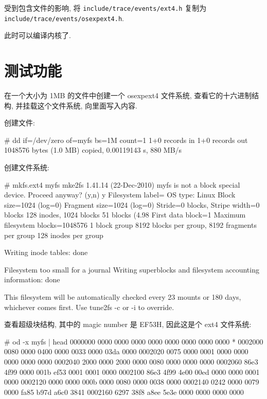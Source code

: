 \documentclass[11pt]{report}
\begin{document}
        受到包含文件的影响, 将 \verb|include/trace/events/ext4.h| 复制为 \\ \verb|include/trace/events/osexpext4.h|.

        此时可以编译内核了.

    \section{测试功能}

        在一个大小为 1MB 的文件中创建一个 osexpext4 文件系统, 查看它的十六进制结构, 并挂载这个文件系统, 向里面写入内容.

        创建文件:

\begin{console}
# dd if=/dev/zero of=myfs bs=1M count=1
1+0 records in
1+0 records out
1048576 bytes (1.0 MB) copied, 0.00119143 s, 880 MB/s
\end{console}

        创建文件系统:

\begin{consolelong}
# mkfs.ext4 myfs
mke2fs 1.41.14 (22-Dec-2010)
myfs is not a block special device.
Proceed anyway? (y,n) y
Filesystem label=
OS type: Linux
Block size=1024 (log=0)
Fragment size=1024 (log=0)
Stride=0 blocks, Stripe width=0 blocks
128 inodes, 1024 blocks
51 blocks (4.98%
First data block=1
Maximum filesystem blocks=1048576
1 block group
8192 blocks per group, 8192 fragments per group
128 inodes per group

Writing inode tables: done

Filesystem too small for a journal
Writing superblocks and filesystem accounting information: done

This filesystem will be automatically checked every 23 mounts or
180 days, whichever comes first.  Use tune2fs -c or -i to override.
\end{consolelong}

        查看超级块结构, 其中的 magic number 是 EF53H, 因此这是个 ext4 文件系统:

\begin{consolelong}
# od -x myfs | head
0000000 0000 0000 0000 0000 0000 0000 0000 0000
*
0002000 0080 0000 0400 0000 0033 0000 03da 0000
0002020 0075 0000 0001 0000 0000 0000 0000 0000
0002040 2000 0000 2000 0000 0080 0000 0000 0000
0002060 86e3 4f99 0000 001b ef53 0001 0001 0000
0002100 86e3 4f99 4e00 00ed 0000 0000 0001 0000
0002120 0000 0000 000b 0000 0080 0000 0038 0000
0002140 0242 0000 0079 0000 fa85 b97d a6c0 3841
0002160 6297 38f8 a8ee 5e3e 0000 0000 0000 0000
\end{consolelong}
\end{document}
